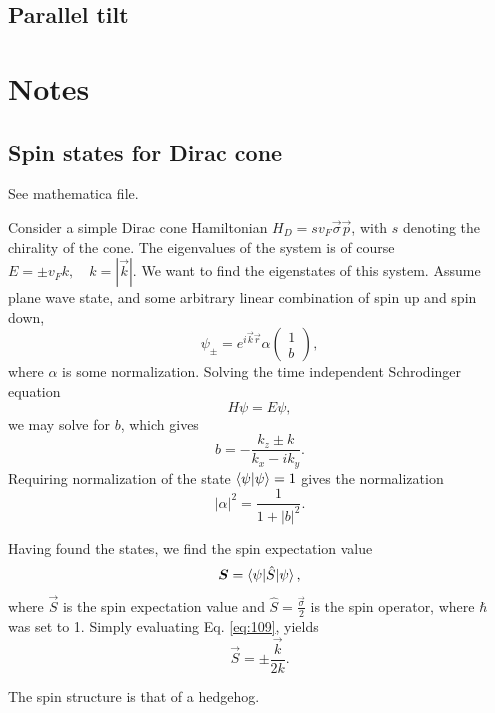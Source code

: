 \subsection{Parallel tilt}



\section{Notes}
\subsection{Spin states for Dirac cone}
See mathematica file.

Consider a simple Dirac cone Hamiltonian \(H_{D} = s v_{F} \vec{\sigma} \vec{p}\), with \(s\) denoting the chirality of the cone.
The eigenvalues of the system is of course \(E = \pm v_{F} k, \quad k=|\vec{k}|\).
We want to find the eigenstates of this system.
Assume plane wave state, and some arbitrary linear combination of spin up and spin down,
\[
  \psi _{\pm} = e^{i \vec{k} \vec{r}} \alpha
  \begin{pmatrix}
    1\\
    b
  \end{pmatrix},
\]
where \(\alpha \) is some normalization.
Solving the time independent Schrodinger equation
\[
H \psi = E \psi,
\]
we may solve for \(b\), which gives
\begin{equation}
  \label{eq:108}
  b = -\frac{k_{z} \pm k}{k_{x} - i k_{y}}.
\end{equation}
Requiring normalization of the state \(\braket{\psi | \psi } = 1\) gives the normalization
\[
|\alpha |^2 = \frac{1}{1 + |b|^2}.
\]

Having found the states, we find the spin expectation value
\begin{equation}
  \label{eq:109}
  \bm{S} = \braket{\psi | \hat{S} | \psi },
\end{equation}
where \(\vec{S}\) is the spin expectation value and \(\hat{S} = \frac{\vec{\sigma}}{2} \) is the spin operator, where \(\hbar \) was set to 1.
Simply evaluating Eq. \eqref{eq:109}, yields
\begin{equation}
  \label{eq:110}
  \vec{S} = \pm \frac{\vec{k}}{2 k}.
\end{equation}

The spin structure is that of a hedgehog.

